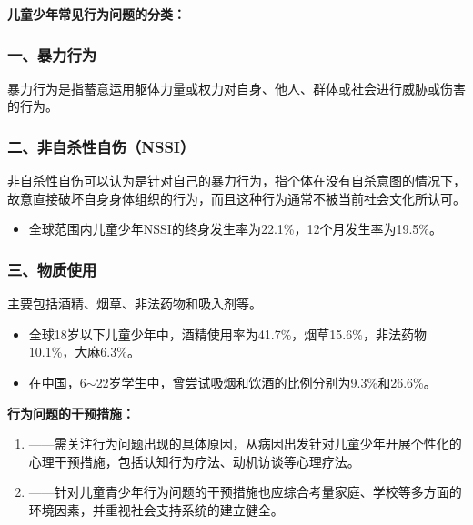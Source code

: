 \begin{keybox}
\textbf{儿童少年常见行为问题的分类：}

\subsubsection*{一、暴力行为}

暴力行为是指蓄意运用躯体力量或权力对自身、他人、群体或社会进行威胁或伤害的行为。

\subsubsection*{二、非自杀性自伤（NSSI）}

非自杀性自伤可以认为是针对自己的暴力行为，指个体在没有自杀意图的情况下，故意直接破坏自身身体组织的行为，而且这种行为通常不被当前社会文化所认可。

\begin{itemize}[leftmargin=*]
    \item 全球范围内儿童少年NSSI的终身发生率为22.1\%，12个月发生率为19.5\%。
\end{itemize}

\subsubsection*{三、物质使用}

主要包括酒精、烟草、非法药物和吸入剂等。

\begin{itemize}[leftmargin=*]
    \item 全球18岁以下儿童少年中，酒精使用率为41.7\%，烟草15.6\%，非法药物10.1\%，大麻6.3\%。
    \item 在中国，6$\sim$22岁学生中，曾尝试吸烟和饮酒的比例分别为9.3\%和26.6\%。
\end{itemize}
\end{keybox}

\begin{tipbox}
\textbf{行为问题的干预措施：}

\begin{enumerate}[leftmargin=*]
    \item {}——需关注行为问题出现的具体原因，从病因出发针对儿童少年开展个性化的心理干预措施，包括认知行为疗法、动机访谈等心理疗法。
    \item {}——针对儿童青少年行为问题的干预措施也应综合考量家庭、学校等多方面的环境因素，并重视社会支持系统的建立健全。
\end{enumerate}

\end{tipbox}


